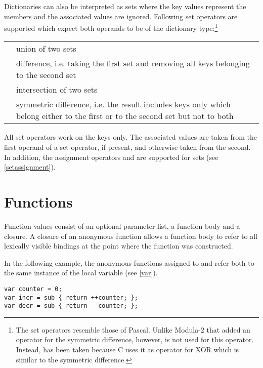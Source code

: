 Dictionaries can also be interpreted as sets\label{sets}
where the key values represent the members and the associated values
are ignored.  Following set operators are supported which expect both
operands to be of the dictionary type:\footnote{The set operators
resemble those of Pascal. Unlike Modula-2 that added an
operator for the symmetric difference, however, \token{/} is
not used for this operator. Instead, \token{\caretSY} has been taken because
C uses it as operator for XOR which is similar to the symmetric
difference.}

\begin{tabular}{l p{4in}}
   \token{+} & union of two sets \\
   \token{$-$} & difference, i.e. taking the first set
      and removing all keys belonging to the second set \\
   \token{$*$} & intersection of two sets \\
   \token{\caretSY} & symmetric difference, i.e. the result
      includes keys only which belong either to the first or
      to the second set but not to both \\
\end{tabular}

\noindent
All set operators work on the keys only.
The associated values are taken from the first operand of a
set operator, if present, and otherwise taken from the second.
In addition, the assignment operators \token{+=} and \token{$-$=}
are supported for sets (see \ref{setassignment}).

\section{Functions}\label{function}

Function values consist of an optional parameter list, a function body
and a closure.
A closure of an anonymous function allows a
function body to refer to all lexically visible bindings at the point
where the function was constructed.

In the following example, the anonymous functions assigned to
 and  refer both to the same instance
of the local variable  (see \ref{var}).

\begin{lstlisting}
var counter = 0;
var incr = sub { return ++counter; };
var decr = sub { return --counter; };
\end{lstlisting}

